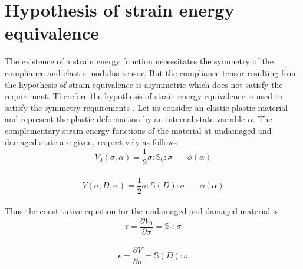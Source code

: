 \documentclass[12pt,a4paper,twoside,openright]{report}
\begin{document}
\section{Hypothesis of strain energy equivalence}\label{Hypothesis of strain energy equivalence}
\indent\indent\indent The existence of a strain energy function necessitates the symmetry of the compliance and elastic modulus tensor. But the compliance tensor resulting from the hypothesis of strain equivalence is asymmetric which does not satisfy the requirement. Therefore the hypothesis of strain energy equivalence is used to satisfy the symmetry requirements \citep{cordebois1982damage}. Let us consider an elastic-plastic material and represent the plastic deformation by an internal state variable $\alpha$. The complementary strain energy functions of the material at undamaged and damaged state are given, respectively as follows
\\
\begin{equation}
V_{0}(\sigma,\alpha) = \frac{1}{2}\sigma : \mathbb{S}_{0} : \sigma \; - \; \phi(\alpha)
\end{equation}
\\
\begin{equation}
V(\sigma,D,\alpha) = \frac{1}{2}\sigma : \mathbb{S}(D) : \sigma \; - \; \phi(\alpha)
\end{equation}
\\
Thus the constitutive equation for the undamaged and damaged material is 
\\
\begin{equation}
\epsilon = \frac{\partial V_{0} }{\partial \sigma} = \mathbb{S}_{0} : \sigma
\end{equation}
\\
\begin{equation}
\epsilon = \frac{\partial V }{\partial \sigma} = \mathbb{S}(D) : \sigma
\label{eqn:Strain_energy_eq}
\end{equation}
\end{document}
